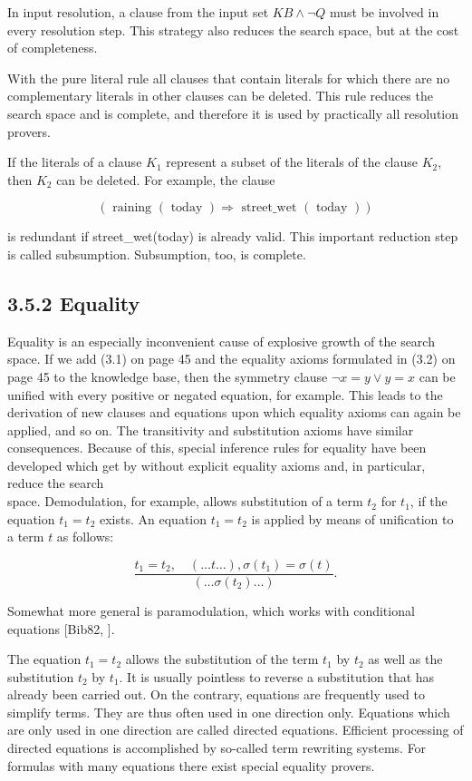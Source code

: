 \documentclass[10pt]{article}
\begin{document}
In input resolution, a clause from the input set $K B \wedge \neg Q$ must be involved in every resolution step. This strategy also reduces the search space, but at the cost of completeness.

With the pure literal rule all clauses that contain literals for which there are no complementary literals in other clauses can be deleted. This rule reduces the search space and is complete, and therefore it is used by practically all resolution provers.

If the literals of a clause $K_{1}$ represent a subset of the literals of the clause $K_{2}$, then $K_{2}$ can be deleted. For example, the clause

$$
(\text { raining }(\text { today }) \Rightarrow \text { street_wet }(\text { today }))
$$

is redundant if street\_wet(today) is already valid. This important reduction step is called subsumption. Subsumption, too, is complete.

\subsection*{3.5.2 Equality}
Equality is an especially inconvenient cause of explosive growth of the search space. If we add (3.1) on page 45 and the equality axioms formulated in (3.2) on page 45 to the knowledge base, then the symmetry clause $\neg x=y \vee y=x$ can be unified with every positive or negated equation, for example. This leads to the derivation of new clauses and equations upon which equality axioms can again be applied, and so on. The transitivity and substitution axioms have similar consequences. Because of this, special inference rules for equality have been developed which get by without explicit equality axioms and, in particular, reduce the search\\
space. Demodulation, for example, allows substitution of a term $t_{2}$ for $t_{1}$, if the equation $t_{1}=t_{2}$ exists. An equation $t_{1}=t_{2}$ is applied by means of unification to a term $t$ as follows:


$$
\frac{t_{1}=t_{2}, \quad(\ldots t \ldots), \sigma\left(t_{1}\right)=\sigma(t)}{\left(\ldots \sigma\left(t_{2}\right) \ldots\right)} .
$$

Somewhat more general is paramodulation, which works with conditional equations [Bib82, \cite{loveland1978automated}].

The equation $t_{1}=t_{2}$ allows the substitution of the term $t_{1}$ by $t_{2}$ as well as the substitution $t_{2}$ by $t_{1}$. It is usually pointless to reverse a substitution that has already been carried out. On the contrary, equations are frequently used to simplify terms. They are thus often used in one direction only. Equations which are only used in one direction are called directed equations. Efficient processing of directed equations is accomplished by so-called term rewriting systems. For formulas with many equations there exist special equality provers.
\end{document}
